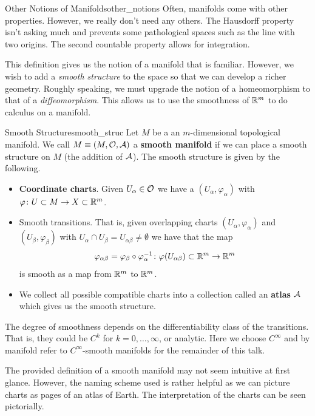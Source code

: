 \begin{rmk}{Other Notions of Manifolds}{other_notions}
Often, manifolds come with other properties.  However, we really don't need any others.  The Hausdorff property isn't asking much and prevents some pathological spaces such as the line with two origins. The second countable property allows for integration.
\end{rmk}

This definition gives us the notion of a manifold that is familiar.  However, we wish to add a \emph{smooth structure} to the space so that we can develop a richer geometry. Roughly speaking, we must upgrade the notion of a homeomorphism to that of a \emph{diffeomorphism}. This allows us to use the smoothness of $\mathbb{R}^m$ to do calculus on a manifold.

\begin{df}{Smooth Structure}{smooth_struc}
Let $M$ be a an $m$-dimensional topological manifold.  We call $M\equiv(M,\mathcal{O},\mathcal{A})$ a \textbf{smooth manifold} if we can place a smooth structure on $M$ (the addition of $\mathcal{A}$). The smooth structure is given by the following.
\begin{itemize}
    \item \textbf{Coordinate charts}. Given $U_\alpha\in \mathcal{O}$ we have a $(U_\alpha,\varphi_\alpha)$ with $\varphi \colon U\subset M \to X \subset \mathbb{R}^m$.
    \item Smooth transitions. That is, given overlapping charts $(U_\alpha,\varphi_\alpha)$ and $(U_\beta,\varphi_\beta)$ with $U_\alpha \cap U_\beta = U_{\alpha \beta} \neq \emptyset$ we have that the map
    \[
    \varphi_{\alpha \beta} = \varphi_\beta \circ \varphi_\alpha^{-1} \colon \varphi(U_{\alpha \beta}) \subset \mathbb{R}^m \to \mathbb{R}^m
    \]
    is smooth as a map from $\mathbb{R}^m$ to $\mathbb{R}^m$.  
    \item We collect all possible compatible charts into a collection called an \textbf{atlas} $\mathcal{A}$ which gives us the smooth structure.
\end{itemize}
The degree of smoothness depends on the differentiability class of the transitions.  That is, they could be $C^k$ for $k=0,\dots,\infty$, or analytic. Here we choose $C^\infty$ and by manifold refer to $C^\infty$-smooth manifolds for the remainder of this talk.
\end{df}

The provided definition of a smooth manifold may not seem intuitive at first glance.  However, the naming scheme used is rather helpful as we can picture charts as pages of an atlas of Earth. The interpretation of the charts can be seen pictorially.

